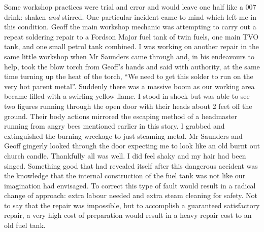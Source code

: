 Some workshop practices were trial and error and would leave one half like a 007
drink: shaken \emph{and} stirred. One particular incident came to mind which
left me in this condition. Geoff the main workshop mechanic was attempting to
carry out a repeat soldering repair to a Fordson Major fuel tank of twin fuels,
one main TVO tank, and one small petrol tank combined. I was working on another
repair in the same little workshop when Mr Saunders came through and, in his
endeavours to help, took the blow torch from Geoff's hands and said with
authority, at the same time turning up the heat of the torch, ``We need to get
this solder to run on the very hot parent metal''. Suddenly there was a massive
boom as our working area became filled with a swirling yellow flame. I stood in
shock but was able to see two figures running through the open door with their
heads about 2 feet off the ground. Their body actions mirrored the escaping
method of a headmaster running from angry bees mentioned earlier in this story.
I grabbed and extinguished the burning wreckage to just steaming metal. Mr
Saunders and Geoff gingerly looked through the door expecting me to look like
an old burnt out church candle. Thankfully all was well. I did feel shaky and
my hair had been singed. Something good that had revealed itself after this
dangerous accident was the knowledge that the internal construction of the fuel
tank was not like our imagination had envisaged. To correct this type of fault
would result in a radical change of approach: extra labour needed and extra
steam cleaning for safety. Not to say that the repair was impossible, but to
accomplish a guaranteed satisfactory repair, a very high cost of preparation
would result in a heavy repair cost to an old fuel tank.
